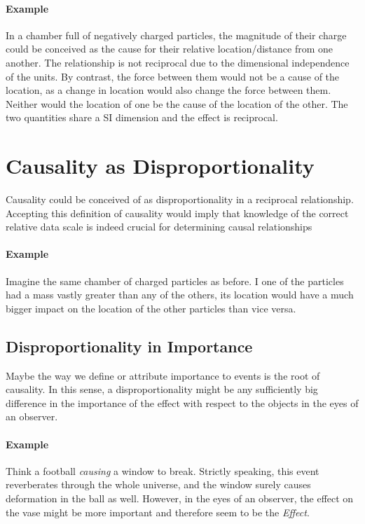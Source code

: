 \documentclass{article}
\begin{document}
\paragraph{Example} In a chamber full of negatively charged particles, the magnitude of their charge could be conceived as the cause for their relative location/distance from one another. The relationship is not reciprocal due to the dimensional independence of the units. By contrast, the force between them would not be a cause of the location, as a change in location would also change the force between them. Neither would the location of one be the cause of the location of the other. The two quantities share a SI dimension and the effect is reciprocal.


\section{Causality as Disproportionality} \label{sec:disproportionality}
Causality could be conceived of as disproportionality in a reciprocal relationship. Accepting this definition of causality would imply that knowledge of the correct relative data scale is indeed crucial for determining causal relationships

\paragraph{Example} Imagine the same chamber of charged particles as before. I one of the particles had a mass vastly greater than any of the others, its location would have a much bigger impact on the location of the other particles than vice versa.

\subsection{Disproportionality in Importance}
Maybe the way we define or attribute importance to events is the root of causality. In this sense, a disproportionality might be any sufficiently big difference in the importance of the effect with respect to the objects in the eyes of an observer.

\paragraph{Example}
Think a football \emph{causing} a window to break. Strictly speaking, this event reverberates through the whole universe, and the  window surely causes deformation in the ball as well. However, in the eyes of an observer, the effect on the vase might be more important and therefore seem to be the \emph{Effect}.
\end{document}
